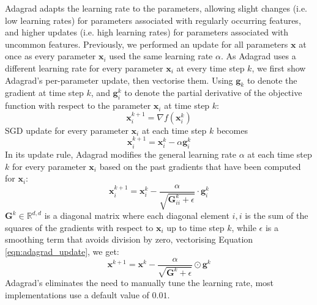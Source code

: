 \documentclass[12pt]{report}
\numberwithin{equation}{section}
\begin{document}
Adagrad {\cite{duchi2011adaptive}} adapts the learning rate to the parameters, allowing slight changes (i.e. low learning rates) for parameters associated with regularly occurring features, and higher updates (i.e. high learning rates) for parameters associated with uncommon features. Previously, we performed an update for all parameters $\bm{x}$ at once as every parameter $\bm{x}_i$ used the same learning rate $\alpha$. As Adagrad uses a different learning rate for every parameter $\bm{x}_i$ at every time step $k$, we first show Adagrad's per-parameter update, then vectorise them. Using $\bm{g}_k$ to denote the gradient at time step $k$, and $\bm{g}^k_{i}$ to denote the partial derivative of the objective function with respect to the parameter $\bm{x}_i$ at time step $k$:
\begin{equation}\label{eqn:adagrad_partial}
\bm{x}^{k+1}_i = \nabla f(\bm{x}^{k}_i)
\end{equation}\noindent
SGD update for every parameter $\bm{x}_i$ at each time step $k$ becomes
\begin{equation}\label{eqn:adagrad_sgd}
\bm{x}^{k+1}_i = \bm{x}^{k}_i - \alpha \bm{g}^{k}_i
\end{equation}\noindent
In its update rule, Adagrad modifies the general learning rate $\alpha$ at each time step $k$ for every parameter $\bm{x}_i$ based on the past gradients that have been computed for 
$\bm{x}_i$:
\begin{equation}\label{eqn:adagrad_update}
\bm{x}^{k+1}_i = \bm{x}^{k}_i - \dfrac{\alpha}{\sqrt{\bm{G}^k_{ii} + \epsilon}} \cdot \bm{g}^{k}_i
\end{equation}\noindent
$\bm{G}^k \in \mathbb{R}^{d,d}$ is a diagonal matrix where each diagonal element $i,i$ is the sum of the squares of the gradients with respect to $\bm{x}_i$ up to time step $k$, while $\epsilon$ is a smoothing term that avoids division by zero, vectorising Equation \ref{eqn:adagrad_update}, we get:
\begin{equation}\label{eqn:adagrad}
\bm{x}^{k+1}= \bm{x}^{k} - \dfrac{\alpha}{\sqrt{\bm{G}^k + \epsilon}} \odot \bm{g}^{k}
\end{equation}\noindent
Adagrad's eliminates the need to manually tune the learning rate, most implementations use a default value of $0.01$. 
\end{document}
